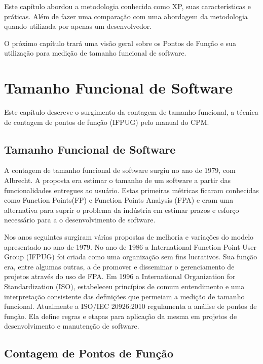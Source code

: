 \begin{table}[]
{\begin{tabular}{|c|l|}
\end{tabular}
}
\end{table}

Este capítulo abordou a metodologia conhecida como XP, suas características e práticas. Além de fazer uma comparação com uma abordagem da metodologia quando utilizada por apenas um desenvolvedor.

O próximo capítulo trará uma visão geral sobre os Pontos de Função e sua utilização para medição de tamanho funcional de software.


\chapter[Tamanho Funcional de Software]{Tamanho Funcional de Software}

Este capítulo descreve o surgimento da contagem de tamanho funcional, a técnica de contagem de pontos de função (IFPUG) pelo manual do CPM.

\section{Tamanho Funcional de Software}

A contagem de tamanho funcional de software surgiu no ano de 1979, com Albrecht. A proposta era estimar o tamanho de um software a partir das funcionalidades entregues ao usuário. Estas primeiras métricas ficaram conhecidas como Function Points(FP)  e  Function Points Analysis (FPA)  e eram uma alternativa para suprir o problema da indústria em estimar prazos e esforço necessário para a o desenvolvimento de software.

Nos anos seguintes surgiram várias propostas de melhoria e variações do modelo apresentado no ano de 1979. No ano de 1986 a International Function Point User Group (IFPUG) foi criada como uma organização sem fins lucrativos. Sua função era, entre algumas outras, a de promover e disseminar o gerenciamento de projetos através do uso de FPA. Em 1996 a International Organization for Standardization (ISO), estabeleceu princípios de comum entendimento e uma interpretação consistente das  definições que permeiam a medição de tamanho funcional. Atualmente a ISO/IEC 20926:2010 regulamenta a análise de pontos de função. Ela define regras e etapas para aplicação da mesma em projetos de desenvolvimento e manutenção de software.

\section{Contagem de Pontos de Função}

